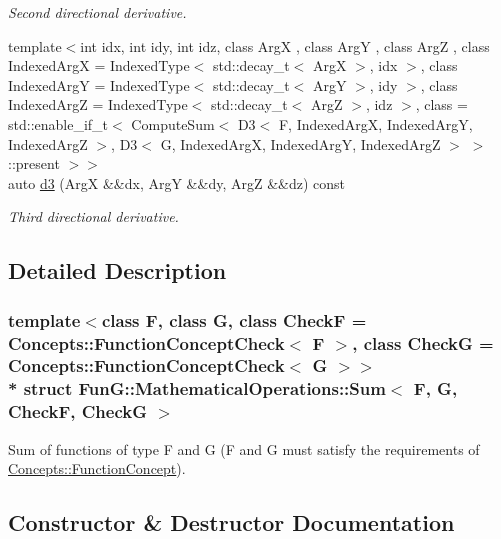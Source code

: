 \begin{DoxyCompactItemize}
\begin{DoxyCompactList}\small\item\em Second directional derivative. \end{DoxyCompactList}\item 
{\footnotesize template$<$int idx, int idy, int idz, class ArgX , class ArgY , class ArgZ , class Indexed\+ArgX  = Indexed\+Type$<$ std\+::decay\+\_\+t$<$ Arg\+X $>$, idx $>$, class Indexed\+ArgY  = Indexed\+Type$<$ std\+::decay\+\_\+t$<$ Arg\+Y $>$, idy $>$, class Indexed\+ArgZ  = Indexed\+Type$<$ std\+::decay\+\_\+t$<$ Arg\+Z $>$, idz $>$, class  = std\+::enable\+\_\+if\+\_\+t$<$                           Compute\+Sum$<$ D3$<$ F, Indexed\+Arg\+X, Indexed\+Arg\+Y, Indexed\+Arg\+Z $>$,                                       D3$<$ G, Indexed\+Arg\+X, Indexed\+Arg\+Y, Indexed\+Arg\+Z $>$ $>$\+::present $>$$>$ }\\auto \hyperlink{structFunG_1_1MathematicalOperations_1_1Sum_a03b4ee4cb48bf45992bef43322982635}{d3} (ArgX \&\&dx, ArgY \&\&dy, ArgZ \&\&dz) const 
\begin{DoxyCompactList}\small\item\em Third directional derivative. \end{DoxyCompactList}\end{DoxyCompactItemize}


\subsection{Detailed Description}
\subsubsection*{template$<$class F, class G, class CheckF = Concepts\+::\+Function\+Concept\+Check$<$ F $>$, class CheckG = Concepts\+::\+Function\+Concept\+Check$<$ G $>$$>$\\*
struct Fun\+G\+::\+Mathematical\+Operations\+::\+Sum$<$ F, G, Check\+F, Check\+G $>$}

Sum of functions of type F and G (F and G must satisfy the requirements of \hyperlink{structFunG_1_1Concepts_1_1FunctionConcept}{Concepts\+::\+Function\+Concept}). 

\subsection{Constructor \& Destructor Documentation}
